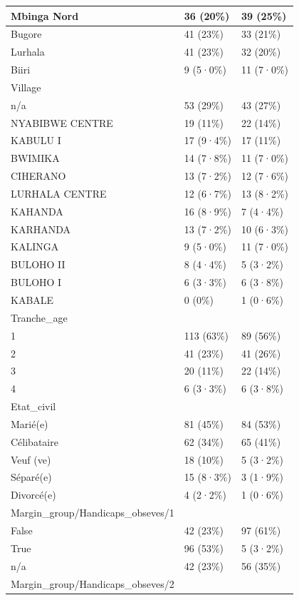 \documentclass[
]{book}
\begin{document}
\begin{tabular}{l|l|l}
\hline
Mbinga Nord & 36 (20\%) & 39 (25\%)\\
\hline
Bugore & 41 (23\%) & 33 (21\%)\\
\hline
Lurhala & 41 (23\%) & 32 (20\%)\\
\hline
Biiri & 9 (5·0\%) & 11 (7·0\%)\\
\hline
Village &  & \\
\hline
n/a & 53 (29\%) & 43 (27\%)\\
\hline
NYABIBWE CENTRE & 19 (11\%) & 22 (14\%)\\
\hline
KABULU I & 17 (9·4\%) & 17 (11\%)\\
\hline
BWIMIKA & 14 (7·8\%) & 11 (7·0\%)\\
\hline
CIHERANO & 13 (7·2\%) & 12 (7·6\%)\\
\hline
LURHALA CENTRE & 12 (6·7\%) & 13 (8·2\%)\\
\hline
KAHANDA & 16 (8·9\%) & 7 (4·4\%)\\
\hline
KARHANDA & 13 (7·2\%) & 10 (6·3\%)\\
\hline
KALINGA & 9 (5·0\%) & 11 (7·0\%)\\
\hline
BULOHO II & 8 (4·4\%) & 5 (3·2\%)\\
\hline
BULOHO I & 6 (3·3\%) & 6 (3·8\%)\\
\hline
KABALE & 0 (0\%) & 1 (0·6\%)\\
\hline
Tranche\_age &  & \\
\hline
1 & 113 (63\%) & 89 (56\%)\\
\hline
2 & 41 (23\%) & 41 (26\%)\\
\hline
3 & 20 (11\%) & 22 (14\%)\\
\hline
4 & 6 (3·3\%) & 6 (3·8\%)\\
\hline
Etat\_civil &  & \\
\hline
Marié(e) & 81 (45\%) & 84 (53\%)\\
\hline
Célibataire & 62 (34\%) & 65 (41\%)\\
\hline
Veuf (ve) & 18 (10\%) & 5 (3·2\%)\\
\hline
Séparé(e) & 15 (8·3\%) & 3 (1·9\%)\\
\hline
Divorcé(e) & 4 (2·2\%) & 1 (0·6\%)\\
\hline
Margin\_group/Handicaps\_obseves/1 &  & \\
\hline
False & 42 (23\%) & 97 (61\%)\\
\hline
True & 96 (53\%) & 5 (3·2\%)\\
\hline
n/a & 42 (23\%) & 56 (35\%)\\
\hline
Margin\_group/Handicaps\_obseves/2 &  & \\

\end{tabular}
\end{document}
